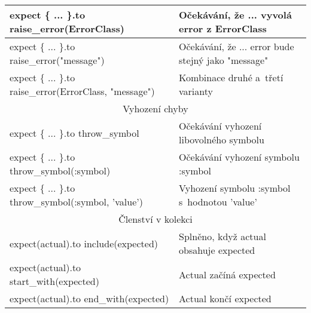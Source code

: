 \begin{center}
\begin{longtable}{| p{} | p{} |}
 \hline
 expect \{ ... \}.to raise\_error(ErrorClass) & Očekávání, že ... vyvolá error z ErrorClass\\
 \hline
 expect \{ ... \}.to raise\_error("message") & Očekávání, že ... error bude stejný jako "message" \\
 \hline
 expect \{ ... \}.to raise\_error(ErrorClass, "message")  & Kombinace druhé a~třetí varianty \\
 \hline
 \multicolumn{2}{||c||}{Vyhození chyby}\\
 \hline\hline
 expect \{ ... \}.to throw\_symbol & Očekávání vyhození libovolného symbolu\\ 
 \hline
 expect \{ ... \}.to throw\_symbol(:symbol) & Očekávání vyhození symbolu :symbol\\ 
 \hline
 expect \{ ... \}.to throw\_symbol(:symbol, 'value') & Vyhození symbolu :symbol s~hodnotou 'value'\\ 
 \hline
 \multicolumn{2}{||c||}{Členství v kolekci}\\
 \hline\hline
 expect(actual).to include(expected) & Splněno, když actual obsahuje expected \\
 \hline
 expect(actual).to start\_with(expected) & Actual začíná expected \\
 \hline
 expect(actual).to end\_with(expected) & Actual končí expected \\
 \hline
 \hline
\end{longtable}
\end{center}

%
%
%
%
